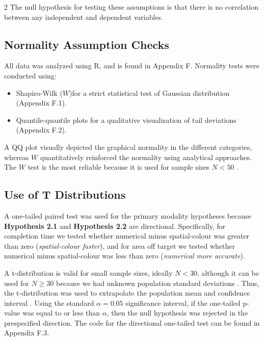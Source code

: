 \documentclass[a4paper,12pt]{article}
\begin{document}
\begin{multicols}{2}
The null hypothesis for testing these assumptions is that there is no correlation between any independent and dependent variables. 

\subsection{Normality Assumption Checks}
All data was analyzed using R, and is found in Appendix F. Normality tests were conducted using:
\begin{itemize}
    \item Shapiro-Wilk ($W$)for a strict statistical test of Gaussian distribution \cite{shapiro} (Appendix F.1). 
    \item Quantile-quantile plots for a qualitative visualization of tail deviations \cite{qq} (Appendix F.2). 
\end{itemize}
A QQ plot visually depicted the graphical normality in the different categories, whereas $W$ quantitatively reinforced the normality using analytical approaches. The $W$ test is the most reliable because it is used for sample sizes $N < 50$ \cite{normality,sp50}.

\subsection{Use of T Distributions}
A one-tailed paired test was used for the primary modality hypotheses because \textbf{Hypothesis 2.1} and \textbf{Hypothesis 2.2} are directional. Specifically, for completion time we tested whether numerical minus spatial-colour was greater than zero (\textit{spatial-colour faster}), and for area off target we tested whether numerical minus spatial-colour was less than zero (\textit{numerical more accurate}).

A t-distribution is valid for small sample sizes, ideally $N < 30$, although it can be used for $N \geq 30 $ because we had unknown population standard deviations \cite{jmp2026tdist}. Thus, the t-distribution was used to extrapolate the population mean and confidence interval \cite{tdist}. Using the standard $\alpha = 0.05$ significance interval, if the one-tailed p-value was equal to or less than $\alpha$, then the null hypothesis was rejected in the prespecified direction. The code for the directional one-tailed test can be found in Appendix F.3. 


\end{multicols}
\end{document}
